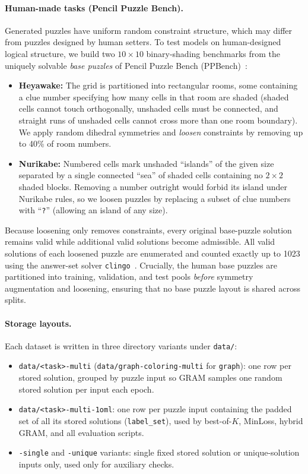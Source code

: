 \documentclass[11pt]{article}
\newcommand{\bok}{best-of-$K$}
\begin{document}
\paragraph{Human-made tasks (Pencil Puzzle Bench).}
Generated puzzles have uniform random constraint structure, which may differ from puzzles designed by human setters. To test models on human-designed logical structure, we build two $10\times 10$ binary-shading benchmarks from the uniquely solvable \emph{base puzzles} of Pencil Puzzle Bench (PPBench)~\cite{waugh2026}:
\begin{itemize}
  \item \textbf{Heyawake:} The grid is partitioned into rectangular rooms, some containing a clue number specifying how many cells in that room are shaded (shaded cells cannot touch orthogonally, unshaded cells must be connected, and straight runs of unshaded cells cannot cross more than one room boundary). We apply random dihedral symmetries and \emph{loosen} constraints by removing up to 40\% of room numbers.
  \item \textbf{Nurikabe:} Numbered cells mark unshaded ``islands'' of the given size separated by a single connected ``sea'' of shaded cells containing no $2\times 2$ shaded blocks. Removing a number outright would forbid its island under Nurikabe rules, so we loosen puzzles by replacing a subset of clue numbers with ``\texttt{?}'' (allowing an island of any size).
\end{itemize}
Because loosening only removes constraints, every original base-puzzle solution remains valid while additional valid solutions become admissible. All valid solutions of each loosened puzzle are enumerated and counted exactly up to 1023 using the answer-set solver \texttt{clingo}~\cite{gebser2019}. Crucially, the human base puzzles are partitioned into training, validation, and test pools \emph{before} symmetry augmentation and loosening, ensuring that no base puzzle layout is shared across splits.

\paragraph{Storage layouts.}
Each dataset is written in three directory variants under \texttt{data/}:
\begin{itemize}
  \item \texttt{data/<task>-multi} (\texttt{data/graph-coloring-multi} for \texttt{graph}): one row per stored solution, grouped by puzzle input so GRAM samples one random stored solution per input each epoch.
  \item \texttt{data/<task>-multi-1oml}: one row per puzzle input containing the padded set of all its stored solutions (\texttt{label\_set}), used by \bok{}, MinLoss, hybrid GRAM, and all evaluation scripts.
  \item \texttt{-single} and \texttt{-unique} variants: single fixed stored solution or unique-solution inputs only, used only for auxiliary checks.
\end{itemize}
\end{document}
